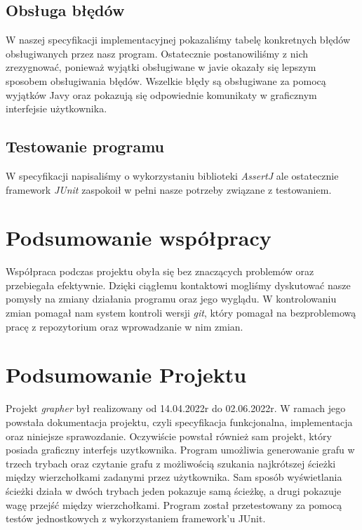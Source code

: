 \documentclass[10pt, a4paper]{report}
\begin{document}
\subsection{Obsługa błędów}\label{subsec:obsługa-błędów}
W naszej specyfikacji implementacyjnej pokazaliśmy tabelę konkretnych błędów obsługiwanych przez nasz program. Ostatecznie postanowiliśmy z nich zrezygnować, ponieważ wyjątki obsługiwane w javie okazały się lepszym
sposobem obsługiwania błędów. Wszelkie błędy są obsługiwane za pomocą wyjątków Javy oraz pokazują się odpowiednie komunikaty w graficznym interfejsie użytkownika.

\subsection{Testowanie programu}\label{subsec:testowanie-programu}
W specyfikacji napisaliśmy o wykorzystaniu biblioteki \textit{AssertJ} ale ostatecznie framework \textit{JUnit} zaspokoił w pełni nasze potrzeby związane z testowaniem.

\section{Podsumowanie współpracy}\label{sec:podsumowanie-współpracy}
Współpraca podczas projektu obyła się bez znaczących problemów oraz przebiegała efektywnie.
Dzięki ciągłemu kontaktowi mogliśmy dyskutować nasze pomysły na zmiany działania programu oraz jego wyglądu.
W kontrolowaniu zmian pomagał nam system kontroli wersji \textit{git}, który pomagał na bezproblemową pracę z repozytorium oraz wprowadzanie w nim zmian.

\section{Podsumowanie Projektu}\label{sec:podsumowanie-projektu}
Projekt \textit{grapher} był realizowany od 14.04.2022r do 02.06.2022r. W ramach jego powstała dokumentacja projektu, czyli
specyfikacja funkcjonalna, implementacja oraz niniejsze sprawozdanie. Oczywiście powstał również sam projekt, który posiada graficzny interfejs uzytkownika.
Program umożliwia generowanie grafu w trzech trybach oraz czytanie grafu z możliwością szukania najkrótszej ścieżki między wierzchołkami zadanymi przez użytkownika.
Sam sposób wyświetlania ścieżki działa w dwóch trybach jeden pokazuje samą ścieżkę, a drugi pokazuje wagę przejść między wierzchołkami. Program został przetestowany za pomocą testów
jednostkowych z wykorzystaniem framework'u JUnit.
\end{document}
